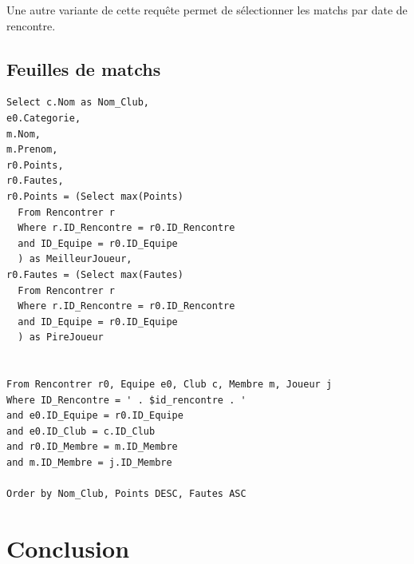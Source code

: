 \documentclass[a4paper»,8pt,french,fleqn]{report}
\begin{document}
Une autre variante de cette requête permet de sélectionner les matchs par date de rencontre.


\section{Feuilles de matchs}

\begin{lstlisting}
Select c.Nom as Nom_Club,
e0.Categorie,
m.Nom,
m.Prenom,
r0.Points,
r0.Fautes, 
r0.Points = (Select max(Points) 
  From Rencontrer r
  Where r.ID_Rencontre = r0.ID_Rencontre
  and ID_Equipe = r0.ID_Equipe
  ) as MeilleurJoueur,
r0.Fautes = (Select max(Fautes) 
  From Rencontrer r
  Where r.ID_Rencontre = r0.ID_Rencontre
  and ID_Equipe = r0.ID_Equipe
  ) as PireJoueur 
            

From Rencontrer r0, Equipe e0, Club c, Membre m, Joueur j
Where ID_Rencontre = ' . $id_rencontre . '
and e0.ID_Equipe = r0.ID_Equipe
and e0.ID_Club = c.ID_Club
and r0.ID_Membre = m.ID_Membre
and m.ID_Membre = j.ID_Membre

Order by Nom_Club, Points DESC, Fautes ASC
\end{lstlisting}

\chapter*{Conclusion}
\end{document}
